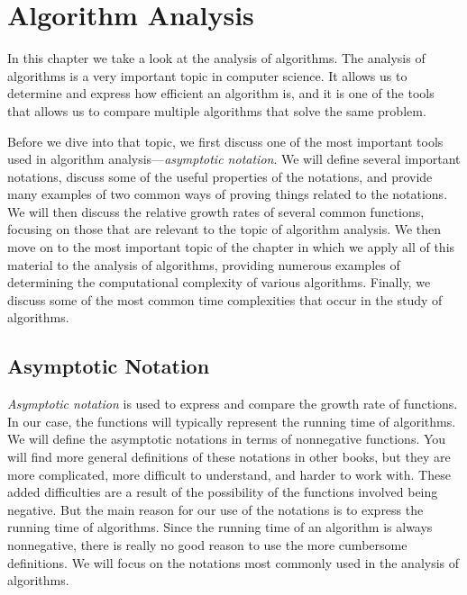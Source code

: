 \chapter{Algorithm Analysis}\label{ch:AlgAn}


In this chapter we take a look at the analysis of algorithms.
The analysis of algorithms is a very important topic in computer science.  
It allows us to determine and express how efficient an algorithm is, 
and it is one of the tools that allows us to compare multiple algorithms
that solve the same problem.

Before we dive into that topic, we first discuss 
one of the most important tools used in algorithm analysis---{\em asymptotic notation}. 
We will define several important notations,
discuss some of the useful properties of the notations, and
provide many examples of two common ways of proving things related to the notations.  
We will then discuss the relative growth rates of several common functions,
focusing on those that are relevant to the topic of algorithm analysis.
We then move on to the most important topic of the chapter in which we 
apply all of this material to the analysis of algorithms, providing
numerous examples of determining the computational complexity of various algorithms.
Finally, we discuss some of the most common time complexities that 
occur in the study of algorithms.


\section{Asymptotic Notation}\label{sec:asymptotic}
{\em Asymptotic notation}
 is used to express and compare the growth rate of functions.
In our case, the functions will typically represent the running time of algorithms.
We will define the asymptotic notations in terms of nonnegative functions.
You will find more general definitions of these notations in other books,
but they are more complicated, more difficult to understand, and harder to work with.  
These added difficulties are a result of the possibility of the functions involved
being negative.
But the main reason for our use of the notations is to express the running time 
of algorithms.  Since the running time of an algorithm is always nonnegative, 
there is really no good reason to use the more cumbersome definitions.
We will focus on the notations most commonly used in the analysis of algorithms.

